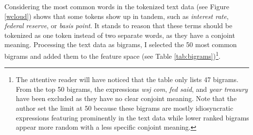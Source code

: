 \documentclass[11pt,a4paper,english,oneside]{book}
\numberwithin{equation}{chapter}
\begin{document}
Considering the most common words in the tokenized text data (see Figure \ref{wcloud}) shows that some tokens show up in tandem, such as \textit{interest rate}, \textit{federal reserve}, or \textit{basis point}. It stands to reason that these terms should be tokenized as one token instead of two separate words, as they have a conjoint meaning. Processing the text data as bigrams, I selected the 50 most common bigrams and added them to the feature space (see Table \ref{tab:bigrams})\footnote{The attentive reader will have noticed that the table only lists 47 bigrams. From the top 50 bigrams, the expressions \textit{wsj com}, \textit{fed said}, and \textit{year treasury} have been excluded as they have no clear conjoint meaning. Note that the author set the limit at 50 because these bigrams are mostly idiosyncratic expressions featuring prominently in the text data while lower ranked bigrams appear more random with a less specific conjoint meaning.}.
\end{document}
